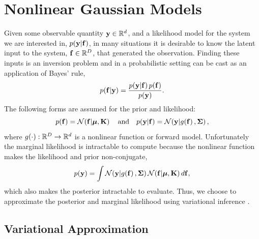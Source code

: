 \documentclass{article} %
\begin{document}
\section{Nonlinear Gaussian Models}
\label{sec:gausmod}

Given some observable quantity $\mathbf{y} \in \mathbb{R}^{d}$, and a likelihood model for
the system we are interested in, $p\!\left({\mathbf{y}}\middle\vert{\ensuremath{\mathbf{f}}}\right)$, in many situations it
is desirable to know the latent input to the system, $\mathbf{f}\in\mathbb{R}^{D}$, that
generated the observation. Finding these inputs is an inversion problem and in
a probabilistic setting can be cast as an application of Bayes' rule,
\begin{equation}
    p\!\left({\mathbf{f}}\middle\vert{\ensuremath{\mathbf{y}}}\right) = \frac{p\!\left({\mathbf{y}}\middle\vert{\ensuremath{\mathbf{f}}}\right)p\!\left({\mathbf{f}}\right)}
        {p\!\left({\mathbf{y}}\right)}.
    \label{eq:bayesrule}
\end{equation}
The following forms are assumed for the prior and likelihood:
\begin{equation}
    p\!\left({\mathbf{f}}\right) = \mathcal{N}\!\left({\mathbf{f}}\middle\vert{\ensuremath{\boldsymbol{\mu}}, \ensuremath{\mathbf{K}}}\right)
    \quad \text{and} \quad
    p\!\left({\mathbf{y}}\middle\vert{\ensuremath{\mathbf{f}}}\right) = \mathcal{N}\!\left({\mathbf{y}}\middle\vert{\ensuremath{g\!\left({{\mathbf{f}}}\right)}, \ensuremath{\boldsymbol{\Sigma}}}\right),
    \label{eq:priorlike}
\end{equation}
where $g\!\left({{\cdot}}\right) : \mathbb{R}^{D} \to \mathbb{R}^{d}$ is a nonlinear function or
forward model. Unfortunately the marginal likelihood is intractable to compute
because the nonlinear function makes the likelihood and prior non-conjugate,
\begin{equation}
    p\!\left({\mathbf{y}}\right) = \int \mathcal{N}\!\left({\mathbf{y}}\middle\vert{\ensuremath{g\!\left({{\mathbf{f}}}\right)}, \ensuremath{\boldsymbol{\Sigma}}}\right)
        \mathcal{N}\!\left({\mathbf{f}}\middle\vert{\ensuremath{\boldsymbol{\mu}}, \ensuremath{\mathbf{K}}}\right) d\mathbf{f},
    \label{eq:marglike}
\end{equation}
which also makes the posterior intractable to evaluate. Thus, we choose to
approximate the posterior and marginal likelihood using variational inference
\cite{Jordan1999}.


\subsection{Variational Approximation}
\end{document}
